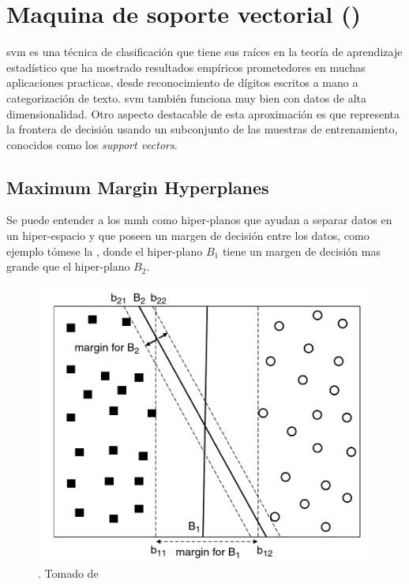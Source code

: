 
\section{Maquina de soporte vectorial ()} \label{sec:SVM}
\gls{svm} es una técnica de clasificación que tiene sus raíces en la teoría de aprendizaje estadístico que ha mostrado resultados empíricos prometedores en muchas aplicaciones practicas, desde reconocimiento de dígitos escritos a mano a categorización de texto. \gls{svm} también funciona muy bien con datos de alta dimensionalidad. Otro aspecto destacable de esta aproximación es que representa la frontera de decisión usando un subconjunto de las muestras de entrenamiento, conocidos como los \emph{support vectors}.

\subsection{Maximum Margin Hyperplanes}
Se puede entender a los \gls{mmh} como hiper-planos que ayudan a separar datos en un hiper-espacio y que poseen un margen de decisión entre los datos, como ejemplo tómese la , donde el hiper-plano $B_1$ tiene un margen de decisión mas grande que el hiper-plano $B_2$.

\begin{figure}[H]
\centering
\includegraphics[scale=0.3]{Figures/svm-hyperplanes.png}
\decoRule
\caption[]{. Tomado de \cite{tan2005introduction}}
\label{fig:svm-hyperplanes}
\end{figure}

